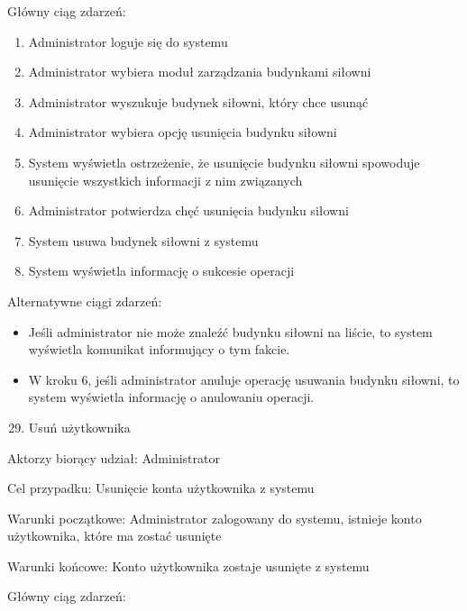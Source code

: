 \documentclass[
]{article}
\providecommand{\tightlist}{%
  \setlength{\itemsep}{0pt}\setlength{\parskip}{0pt}}
\begin{document}
{Główny ciąg zdarzeń:}

\begin{enumerate}
\tightlist
\item
  {Administrator loguje się do systemu}
\item
  {Administrator wybiera moduł zarządzania budynkami siłowni}
\item
  {Administrator wyszukuje budynek siłowni, który chce usunąć}
\item
  {Administrator wybiera opcję usunięcia budynku siłowni}
\item
  {System wyświetla ostrzeżenie, że usunięcie budynku siłowni spowoduje
  usunięcie wszystkich informacji z nim związanych}
\item
  {Administrator potwierdza chęć usunięcia budynku siłowni}
\item
  {System usuwa budynek siłowni z systemu}
\item
  {System wyświetla informację o sukcesie operacji}
\end{enumerate}

{Alternatywne ciągi zdarzeń:}

\begin{itemize}
\tightlist
\item
  {Jeśli administrator nie może znaleźć budynku siłowni na liście, to
  system wyświetla komunikat informujący o tym fakcie. }
\item
  {W kroku 6, jeśli administrator anuluje operację usuwania budynku
  siłowni, to system wyświetla informację o anulowaniu operacji.}
\end{itemize}

{}

\begin{enumerate}
\setcounter{enumi}{28}
\tightlist
\item
  {Usuń użytkownika}
\end{enumerate}

{Aktorzy biorący udział: Administrator}

{Cel przypadku: Usunięcie konta użytkownika z systemu}

{Warunki początkowe: Administrator zalogowany do systemu, istnieje konto
użytkownika, które ma zostać usunięte}

{Warunki końcowe: Konto użytkownika zostaje usunięte z systemu}

{Główny ciąg zdarzeń:}
\end{document}
